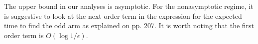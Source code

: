 \begin{itemize}
{The upper bound in our analyses is asymptotic. For the nonasymptotic regime, it is suggestive to look at the next order term in the expression for the expected time to find the odd arm as explained on pp. 207. It is worth noting that the first order term is $O(\log 1/\epsilon)$.}
%

\end{itemize}













